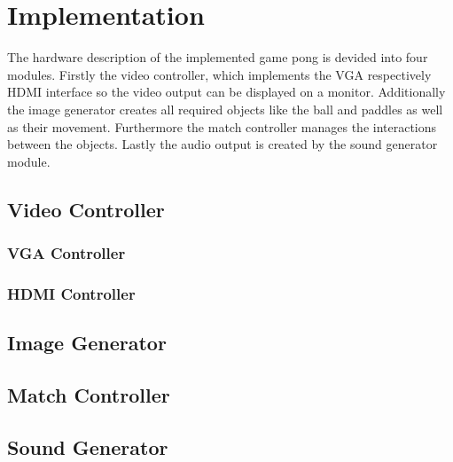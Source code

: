 \section{Implementation}
The hardware description of the implemented game pong is devided into four modules. Firstly the video controller, which implements the VGA respectively HDMI interface so the video output can be displayed on a monitor. Additionally the image generator creates all required objects like the ball and paddles as well as their movement. Furthermore the match controller manages the interactions between the objects. Lastly the audio output is created by the sound generator module.
	\subsection{Video Controller}
        \subsubsection{VGA Controller}
        \subsubsection{HDMI Controller}
    \subsection{Image Generator}
    \subsection{Match Controller}
    \subsection{Sound Generator}
